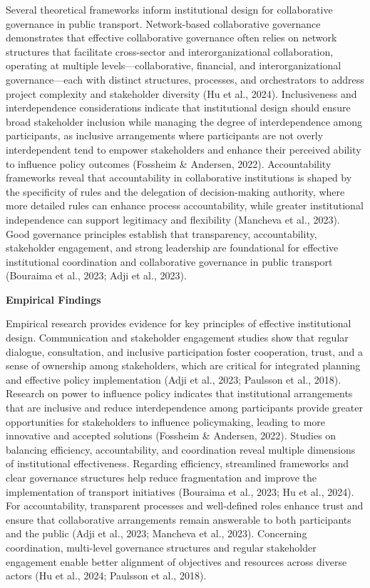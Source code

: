 Several theoretical frameworks inform institutional design for
collaborative governance in public transport. Network-based
collaborative governance demonstrates that effective collaborative
governance often relies on network structures that facilitate
cross-sector and interorganizational collaboration, operating at
multiple levels---collaborative, financial, and interorganizational
governance---each with distinct structures, processes, and orchestrators
to address project complexity and stakeholder diversity (Hu et al.,
2024). Inclusiveness and interdependence considerations indicate that
institutional design should ensure broad stakeholder inclusion while
managing the degree of interdependence among participants, as inclusive
arrangements where participants are not overly interdependent tend to
empower stakeholders and enhance their perceived ability to influence
policy outcomes (Fossheim \& Andersen, 2022). Accountability frameworks
reveal that accountability in collaborative institutions is shaped by
the specificity of rules and the delegation of decision-making
authority, where more detailed rules can enhance process accountability,
while greater institutional independence can support legitimacy and
flexibility (Mancheva et al., 2023). Good governance principles
establish that transparency, accountability, stakeholder engagement, and
strong leadership are foundational for effective institutional
coordination and collaborative governance in public transport (Bouraima
et al., 2023; Adji et al., 2023).

\textbf{Empirical Findings}

Empirical research provides evidence for key principles of effective
institutional design. Communication and stakeholder engagement studies
show that regular dialogue, consultation, and inclusive participation
foster cooperation, trust, and a sense of ownership among stakeholders,
which are critical for integrated planning and effective policy
implementation (Adji et al., 2023; Paulsson et al., 2018). Research on
power to influence policy indicates that institutional arrangements that
are inclusive and reduce interdependence among participants provide
greater opportunities for stakeholders to influence policymaking,
leading to more innovative and accepted solutions (Fossheim \& Andersen,
2022). Studies on balancing efficiency, accountability, and coordination
reveal multiple dimensions of institutional effectiveness. Regarding
efficiency, streamlined frameworks and clear governance structures help
reduce fragmentation and improve the implementation of transport
initiatives (Bouraima et al., 2023; Hu et al., 2024). For
accountability, transparent processes and well-defined roles enhance
trust and ensure that collaborative arrangements remain answerable to
both participants and the public (Adji et al., 2023; Mancheva et al.,
2023). Concerning coordination, multi-level governance structures and
regular stakeholder engagement enable better alignment of objectives and
resources across diverse actors (Hu et al., 2024; Paulsson et al.,
2018).

